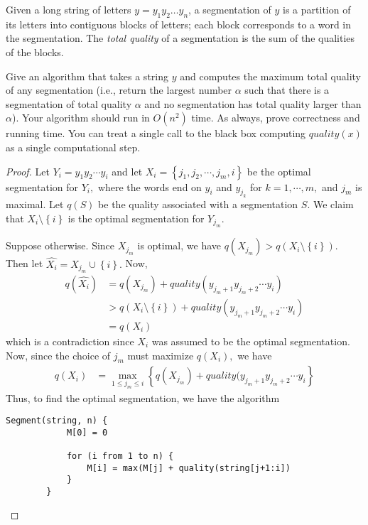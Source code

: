 \documentclass{article}
\begin{document}
Given a long string of letters $y = y_1 y_2 \dots y_n$, a segmentation of $y$ is a partition of its letters into contiguous blocks of letters; each block corresponds to a word in the segmentation.  The \emph{total quality} of a segmentation is the sum of the qualities of the blocks.  

Give an algorithm that takes a string $y$ and computes the maximum total quality of any segmentation (i.e., return the largest number $\alpha$ such that there is a segmentation of total quality $\alpha$ and no segmentation has total quality larger than $\alpha$).  Your algorithm should run in $O(n^2)$ time.  As always, prove correctness and running time.  You can treat a single call to the black box computing $quality(x)$ as a single computational step.  
\begin{proof}
	Let $Y_i=y_1y_2\cdots y_i$ and let $X_i=\left\{ j_1, j_2, \cdots, j_m, i \right\}$ be the optimal segmentation for $Y_i,$ where the words end on $y_i$ and $y_{j_k}$ for $k=1, \cdots, m,$ and $j_m$ is maximal. Let $q(S)$ be the quality associated with a segmentation $S.$ We claim that $X_i\setminus\left\{i\right\}$ is the optimal segmentation for $Y_{j_m}.$

	Suppose otherwise. Since $X_{j_m}$ is optimal, we have $q(X_{j_m})>q(X_i\setminus\left\{ i \right\}).$ Then let $\hat{X_i}=X_{j_m}\cup \left\{ i \right\}.$ Now,
	\begin{align*}
		q(\hat{X_i}) &= q(X_{j_m}) + quality(y_{j_m+1}y_{j_m+2}\cdots y_i) \\
		&> q(X_i\setminus\left\{ i \right\}) + quality(y_{j_m+1}y_{j_m+2}\cdots y_i) \\
		&= q(X_i)
	\end{align*}
	which is a contradiction since $X_i$ was assumed to be the optimal segmentation. Now, since the choice of $j_m$ must maximize $q(X_i),$ we have
	\begin{align*}
		q(X_i) &= \max_{1\le j_m\le i} \left\{ q(X_{j_m}) + quality(y_{j_m+1}y_{j_m+2}\cdots y_i \right\} \tag{2}
	\end{align*}
	Thus, to find the optimal segmentation, we have the algorithm
	\begin{Verbatim}[tabsize=4]
		Segment(string, n) {
			M[0] = 0

			for (i from 1 to n) {
				M[i] = max(M[j] + quality(string[j+1:i])
			}
		}
	\end{Verbatim}


\end{proof}
\end{document}
